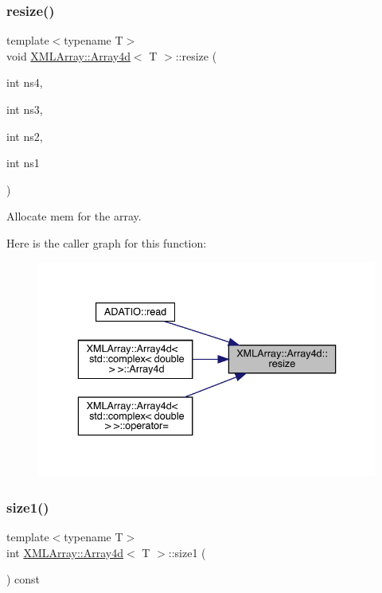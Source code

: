 \subsubsection{\texorpdfstring{resize()}{resize()}\hspace{0.1cm}{\footnotesize\ttfamily [2/2]}}
{\footnotesize\ttfamily template$<$typename T$>$ \\
void \mbox{\hyperlink{classXMLArray_1_1Array4d}{X\+M\+L\+Array\+::\+Array4d}}$<$ T $>$\+::resize (\begin{DoxyParamCaption}\item[{int}]{ns4,  }\item[{int}]{ns3,  }\item[{int}]{ns2,  }\item[{int}]{ns1 }\end{DoxyParamCaption})\hspace{0.3cm}{\ttfamily [inline]}}



Allocate mem for the array. 

Here is the caller graph for this function\+:\nopagebreak
\begin{figure}[H]
\begin{center}
\leavevmode
\includegraphics[width=336pt]{de/d16/classXMLArray_1_1Array4d_a8726b8005ecb501662b5e76873702480_icgraph}
\end{center}
\end{figure}
\mbox{\label{classXMLArray_1_1Array4d_a27899b6dccfd5d85d299da80da9a4c14}} 
\subsubsection{\texorpdfstring{size1()}{size1()}\hspace{0.1cm}{\footnotesize\ttfamily [1/2]}}
{\footnotesize\ttfamily template$<$typename T$>$ \\
int \mbox{\hyperlink{classXMLArray_1_1Array4d}{X\+M\+L\+Array\+::\+Array4d}}$<$ T $>$\+::size1 (\begin{DoxyParamCaption}{ }\end{DoxyParamCaption}) const\hspace{0.3cm}{\ttfamily [inline]}}



